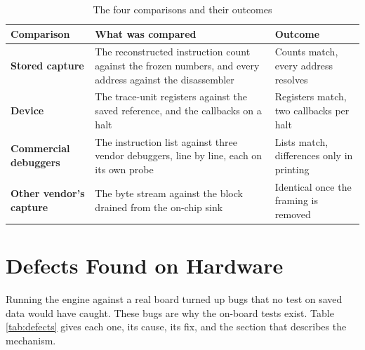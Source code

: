 \begin{table}[htbp]
    \centering
    \caption{The four comparisons and their outcomes}
    \label{tab:correctness}
    \begin{tabularx}{\linewidth}{| @{}>{\hsize\bfseries}Y | >{\hsize}Y | >{\hsize}Y@{} |}
        \hline
        Comparison & \textbf{What was compared} & \textbf{Outcome} \\
        \hline
        Stored capture & The reconstructed instruction count against the frozen numbers, and every address against the disassembler & Counts match, every address resolves \\
        \hline
        Device & The trace-unit registers against the saved reference, and the callbacks on a halt & Registers match, two callbacks per halt \\
        \hline
        Commercial debuggers & The instruction list against three vendor debuggers, line by line, each on its own probe & Lists match, differences only in printing \\
        \hline
        Other vendor's capture & The byte stream against the block drained from the on-chip sink & Identical once the framing is removed \\
        \hline
    \end{tabularx}
\end{table}


\section{Defects Found on Hardware}
\label{subsec:field_issues}
Running the engine against a real board turned up bugs that no test on saved data would have caught. These bugs are why the on-board tests exist. Table \ref{tab:defects} gives each one, its cause, its fix, and the section that describes the mechanism.

